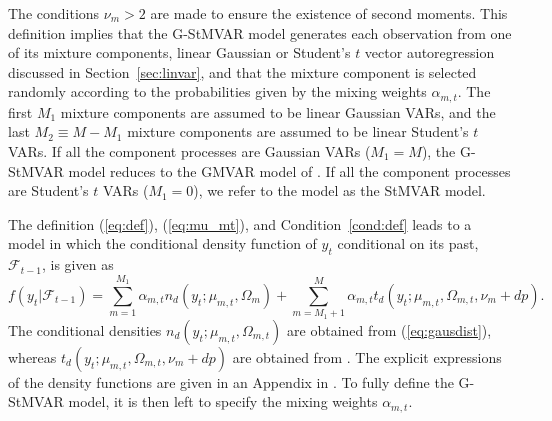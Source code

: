 \documentclass[nojss]{jss} %
\begin{document}
The conditions $\nu_m>2$ are made to ensure the existence of second moments.  This definition implies that the G-StMVAR model generates each observation from one of its mixture components, linear Gaussian or Student's $t$ vector autoregression discussed in Section~\ref{sec:linvar}, and that the mixture component is selected randomly according to the probabilities given by the mixing weights $\alpha_{m,t}$. The first $M_1$ mixture components are assumed to be linear Gaussian VARs,  and the last $M_2\equiv M - M_1$ mixture components are assumed to be linear Student's $t$ VARs.  If all the component processes are Gaussian VARs ($M_1=M$),  the G-StMVAR model reduces to the GMVAR model of \cite{Kalliovirta+Meitz+Saikkonen:2016}.  If all the component processes are Student's $t$ VARs ($M_1=0$),  we refer to the model as the StMVAR model. %

The definition (\ref{eq:def}),  (\ref{eq:mu_mt}), and Condition~\ref{cond:def} leads to a model in which the conditional density function of $y_t$ conditional on its past, $\mathcal{F}_{t-1}$,  is given as
\begin{equation}\label{eq:conddist}
f(y_t|\mathcal{F}_{t-1}) = \sum_{m=1}^{M_1}\alpha_{m,t}n_d(y_t;\mu_{m,t},\Omega_{m}) +  \sum_{m=M_1+1}^M\alpha_{m,t}t_d(y_t;\mu_{m,t},\Omega_{m,t},\nu_m+dp).
\end{equation}
The conditional densities $n_d(y_t;\mu_{m,t},\Omega_{m,t})$ are obtained from (\ref{eq:gausdist}),  whereas $t_d(y_t;\mu_{m,t},\Omega_{m,t},\nu_m+dp)$ are obtained from \citet[Theorem 1]{Virolainen2:2021}. The explicit expressions of the density functions are given in an Appendix in \cite{Virolainen2:2021}. To fully define the G-StMVAR model, it is then left to specify the mixing weights $\alpha_{m,t}$.
\end{document}
